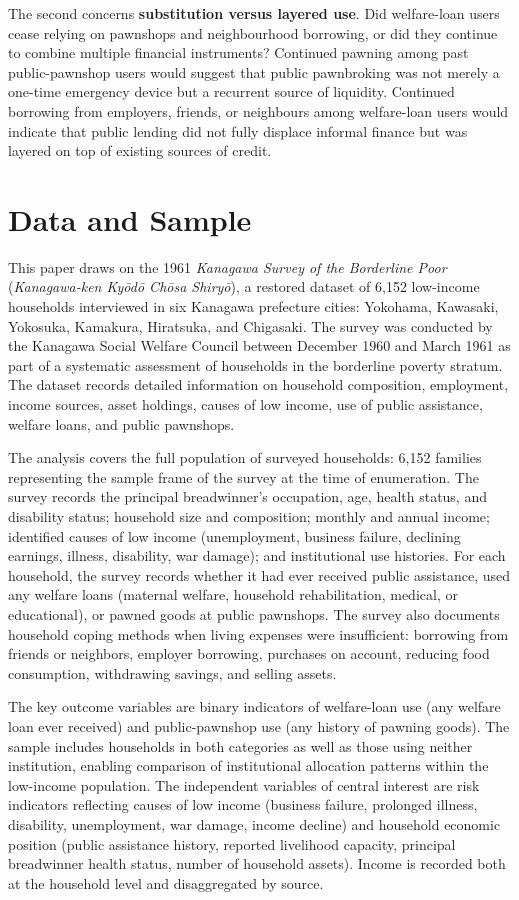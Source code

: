 \documentclass[12pt,a4paper]{article}
\begin{document}
The second concerns \textbf{substitution versus layered use}. Did welfare-loan users cease relying on pawnshops and neighbourhood borrowing, or did they continue to combine multiple financial instruments? Continued pawning among past public-pawnshop users would suggest that public pawnbroking was not merely a one-time emergency device but a recurrent source of liquidity. Continued borrowing from employers, friends, or neighbours among welfare-loan users would indicate that public lending did not fully displace informal finance but was layered on top of existing sources of credit.

\newpage

\section{Data and Sample}

This paper draws on the 1961 \emph{Kanagawa Survey of the Borderline Poor} (\emph{Kanagawa-ken Kyōdō Chōsa Shiryō}), a restored dataset of 6,152 low-income households interviewed in six Kanagawa prefecture cities: Yokohama, Kawasaki, Yokosuka, Kamakura, Hiratsuka, and Chigasaki. The survey was conducted by the Kanagawa Social Welfare Council between December 1960 and March 1961 as part of a systematic assessment of households in the borderline poverty stratum. The dataset records detailed information on household composition, employment, income sources, asset holdings, causes of low income, use of public assistance, welfare loans, and public pawnshops.

The analysis covers the full population of surveyed households: 6,152 families representing the sample frame of the survey at the time of enumeration. The survey records the principal breadwinner's occupation, age, health status, and disability status; household size and composition; monthly and annual income; identified causes of low income (unemployment, business failure, declining earnings, illness, disability, war damage); and institutional use histories. For each household, the survey records whether it had ever received public assistance, used any welfare loans (maternal welfare, household rehabilitation, medical, or educational), or pawned goods at public pawnshops. The survey also documents household coping methods when living expenses were insufficient: borrowing from friends or neighbors, employer borrowing, purchases on account, reducing food consumption, withdrawing savings, and selling assets.

The key outcome variables are binary indicators of welfare-loan use (any welfare loan ever received) and public-pawnshop use (any history of pawning goods). The sample includes households in both categories as well as those using neither institution, enabling comparison of institutional allocation patterns within the low-income population. The independent variables of central interest are risk indicators reflecting causes of low income (business failure, prolonged illness, disability, unemployment, war damage, income decline) and household economic position (public assistance history, reported livelihood capacity, principal breadwinner health status, number of household assets). Income is recorded both at the household level and disaggregated by source.
\end{document}
